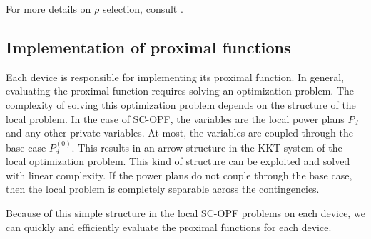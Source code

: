 For more details on $\rho$ selection, consult \cite{BP:11,KC:13}.

\subsection{Implementation of proximal functions}
Each device is responsible for implementing its proximal function. In
general, evaluating the proximal function requires solving an
optimization problem. The complexity of solving this optimization
problem depends on the structure of the local problem. In the case of
SC-OPF, the variables are the local power plans $P_d$ and any other
private variables. At most, the variables are coupled through the base
case $P_d^{(0)}$. This results in an arrow structure in the KKT system
of the local optimization problem. This kind of structure can be
exploited and solved with linear complexity. If the power plans do not
couple through the base case, then the local problem is completely
separable across the contingencies.

Because of this simple structure in the local SC-OPF problems on each
device, we can quickly and efficiently evaluate the proximal functions
for each device.
